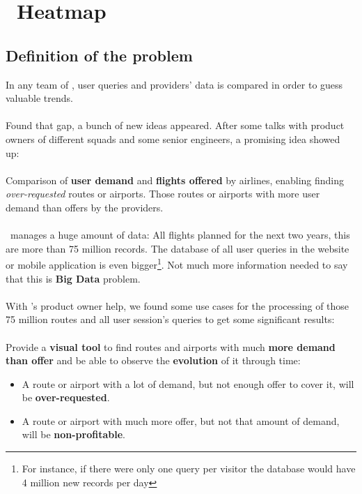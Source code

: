 
\chapter{\company\ Heatmap}

\label{chapter03}


\section{Definition of the problem} \label{problem}

In any team of \company, user queries and providers' data is compared in order to guess valuable trends.
\\\\
Found that gap, a bunch of new ideas appeared. After some talks with product owners of different squads and some senior engineers, a promising idea showed up:
\\\\
Comparison of \textbf{user demand} and \textbf{flights offered} by airlines, enabling finding \textit{over-requested} routes or airports. Those routes or airports with more user demand than offers by the providers.
\\\\
\squad\ manages a huge amount of data: All flights planned for the next two years, this are more than 75 million records. The database of all user queries in the website or mobile application is even bigger\footnote{For instance, if there were only one query per visitor the database would have 4 million new records per day}. Not much more information needed to say that this is \textbf{Big Data} problem.
\\\\
With \squad's product owner help, we found some use cases for the processing of those 75 million routes and all user session's queries to get some significant results:
\\\\
Provide a \textbf{visual tool} to find routes and airports with much \textbf{more demand than offer} and be able to observe the \textbf{evolution} of it {through time}:

\begin{itemize}
  \item A route or airport with a lot of demand, but not enough offer to cover it, will be \textbf{over-requested}.
  \item A route or airport with much more offer, but not that amount of demand, will be \textbf{non-profitable}.
\end{itemize}

